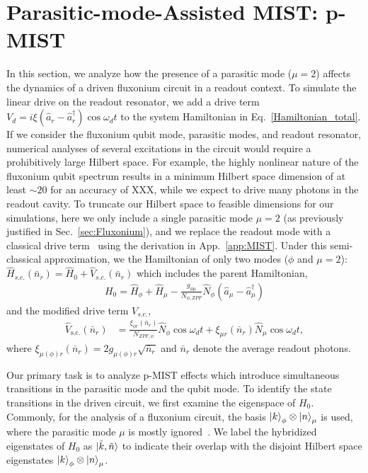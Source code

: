 \documentclass[%
reprint,
superscriptaddress,
 amsmath,amssymb,
 aps,
 prx,
longbibliography,
floatfix,
]{revtex4-2}
\begin{document}
\section{Parasitic-mode-Assisted MIST: p-MIST}\label{sec:MIST}

 In this section, we analyze how the presence of a parasitic mode ($\mu=2$) affects the dynamics of a driven fluxonium circuit in a readout context. To simulate the linear drive on the readout resonator, we add a drive term $V_d=i\xi (\hat a_r-\hat a_r^\dagger)\cos{\omega_d t}$ to the system Hamiltonian in Eq.~\ref{Hamiltonian_total}. If we consider the fluxonium qubit mode, parasitic modes, and readout resonator, numerical analyses of several excitations in the circuit would require a prohibitively large Hilbert space. For example, the highly nonlinear nature of the fluxonium qubit spectrum results in a minimum Hilbert space dimension of at least $\sim 20$ for an accuracy of XXX, while we expect to drive many photons in the readout cavity. To truncate our Hilbert space to feasible dimensions for our simulations, here we only include a single parasitic mode $\mu=2$ (as previously justified in Sec.~\ref{sec:Fluxonium}), and we replace the readout mode with a classical drive term~\cite{cohen2023reminiscence,dumas2024unified,xiao2023diagrammatic} using the derivation in App.~\ref{app:MIST}. Under this semi-classical approximation, we the Hamiltonian of only two modes ($\phi$ and $\mu=2$): $\hat H_{s.c.}(\bar n_r)=\hat H_0+\hat V_{s.c.}(\bar n_r)$ which 
includes the parent Hamiltonian,
\begin{align}
H_0=\hat H_\phi+\hat H_{\mu}-\frac{g_{\phi\mu}}{N_{\phi,ZPF}} \hat N_\phi (\hat a_{\mu}-\hat a_{\mu}^\dagger)    
\end{align}
and the modified drive term $V_{s.c.}$,
\begin{align}
    \hat V_\textrm{s.c.}(\bar n_r)&=\frac{\xi_{\phi r}(\bar n_r)}{N_{ZPF,\phi}} \hat N_\phi\cos{\omega_d t}+\xi_{\mu r}(\bar n_r) \hat N_\mu\cos{\omega_d t},\label{eq:drive}
\end{align}
where $\xi_{\mu(\phi) r}(\bar n_r)=2g_{\mu(\phi) r}\sqrt{\bar n_r}$ and $\bar n_r$ denote the average readout photons. 


Our primary task is to analyze p-MIST effects which introduce simultaneous transitions in the parasitic mode and the qubit mode. To identify the state transitions in the driven circuit, we first examine the eigenspace of $H_0$. Commonly, for the analysis of a fluxonium circuit, the basis $\ket{k}_{\phi} \otimes \ket{n}_{\mu}$ is used, where the parasitic mode $\mu$ is mostly ignored~\cite{nesterov2024measurement}. We label the hybridized eigenstates of $H_{\textrm{0}}$ as  $\ket{\tilde{k}, \tilde{n}}$ to indicate their overlap with the disjoint Hilbert space eigenstates $\ket{k}_\phi\otimes\ket{n}_\mu$. 
\end{document}

